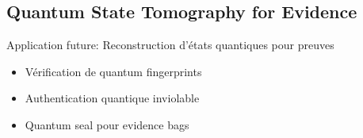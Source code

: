 \subsection{Quantum State Tomography for Evidence}
Application future: Reconstruction d'états quantiques pour preuves

\begin{itemize}
\item Vérification de quantum fingerprints
\item Authentication quantique inviolable
\item Quantum seal pour evidence bags
\end{itemize}